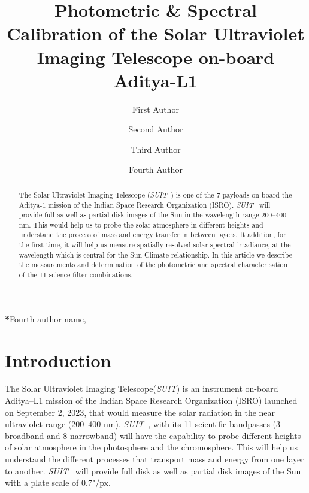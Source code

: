 \documentclass[12pt]{spieman}  %
\title{Photometric \& Spectral Calibration of the Solar Ultraviolet Imaging Telescope on-board Aditya-L1}
\author[a]{First Author}
\author[a]{Second Author}
\author[b]{Third Author}
\author[a,b,*]{Fourth Author}
\affil[a]{University Name, Faculty Group, Department, Street Address, City, Country, Postal Code}
\affil[b]{Company Name, Street Address, City, Country, Postal Code}
\newcommand{\suit}{{\it{SUIT}}}
\begin{document}
 
\maketitle

\begin{abstract}
The Solar Ultraviolet Imaging Telescope (\suit~) is one of the 7 payloads on board the Aditya-1 mission of the Indian Space Research Organization (ISRO). \suit~ will provide full as well as partial disk images of the Sun in the wavelength range 200{--}400 nm. This would help us to probe the solar atmosphere in different heights and understand the process of mass and energy transfer in between layers. It addition, for the first time, it will help us measure spatially resolved solar spectral irradiance, at the wavelength which is central for the Sun-Climate relationship. In this article we describe the measurements and determination of the photometric and spectral characterisation of the 11 science filter combinations.  
\end{abstract}


{\noindent \footnotesize\textbf{*}Fourth author name,   }


\section{Introduction}\label{sec:intro}

The Solar Ultraviolet Imaging Telescope(\suit) \cite{ghosh16,article} is an instrument on-board Aditya{--}L1 mission \cite{adityal1,aditya} of the Indian Space Research Organization (ISRO) launched on September 2, 2023, that would measure the solar radiation in the near ultraviolet range (200{--}400 nm). \suit~, with its 11 scientific bandpasses (3 broadband and 8 narrowband) will have the capability to probe different heights of solar atmosphere in the photosphere and the chromosphere. This will help us understand the different processes that transport mass and energy from one layer to another. \suit~ will provide full disk as well as partial disk images of the Sun with a plate scale of 0.7"/px.
\end{document}
